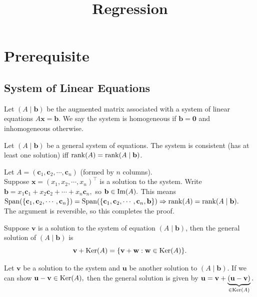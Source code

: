 \documentclass[12pt]{article}
\title{Regression}
\begin{document}
\maketitle

\section{Prerequisite}
\subsection{System of Linear Equations}

\begin{definition}
    Let $(A\mid \mathbf{b})$ be the augmented matrix associated with a system of linear equations $A\mathbf{x}=\mathbf{b}$.
    We say the system is homogeneous if $\mathbf{b}=\mathbf{0}$ and inhomogeneous otherwise.
\end{definition}

\begin{theorem}
    Let $(A\mid\mathbf{b})$ be a general system of equations.
    The system is consistent (has at least one solution) iff $\operatorname{rank}(A)=\operatorname{rank}(A\mid \mathbf{b})$.
\end{theorem}

\begin{pfbox}
    Let $A=(\mathbf{c}_1,\mathbf{c}_2,\cdots,\mathbf{c}_n)$ (formed by $n$ columns).\\
    Suppose $\mathbf{x}=(x_1,x_2,\cdots,x_n)^\top$ is a solution to the system. Write $\mathbf{b}=x_1\mathbf{c}_1+x_2\mathbf{c}_2+\cdots +x_n\mathbf{c}_n,$ so $\mathbf{b}\in\operatorname{Im}(A).$
    This means $\mathrm{Span}(\{\mathbf{c}_1,\mathbf{c}_2,\cdots,\mathbf{c}_n\})=\mathrm{Span}(\{\mathbf{c}_1,\mathbf{c}_2,\cdots,\mathbf{c}_n,\mathbf{b}\})\Rightarrow \operatorname{rank}(A)=\operatorname{rank}(A\mid \mathbf{b}).$\\
    The argument is reversible, so this completes the proof.
\end{pfbox}

\begin{theorem}
Suppose $\mathbf{v}$ is a solution to the system of equation $(A\mid \mathbf{b})$,
then the general solution of $(A\mid \mathbf{b})$ is
\[\mathbf{v}+\operatorname{Ker}(A)=\{\mathbf{v}+\mathbf{w}:\mathbf{w}\in \operatorname{Ker}(A)\}.\]
\end{theorem}

\begin{pfbox}
Let $\mathbf{v}$ be a solution to the system and $\mathbf{u}$ be another solution to $(A\mid \mathbf{b}).$
If we can show $\mathbf{u}-\mathbf{v}\in\operatorname{Ker}(A),$ then the general solution is given by $\mathbf{u}=\mathbf{v}+\underbrace{(\mathbf{u}-\mathbf{v})}_{\in\operatorname{Ker}(A)}.$
\end{pfbox}
\end{document}
